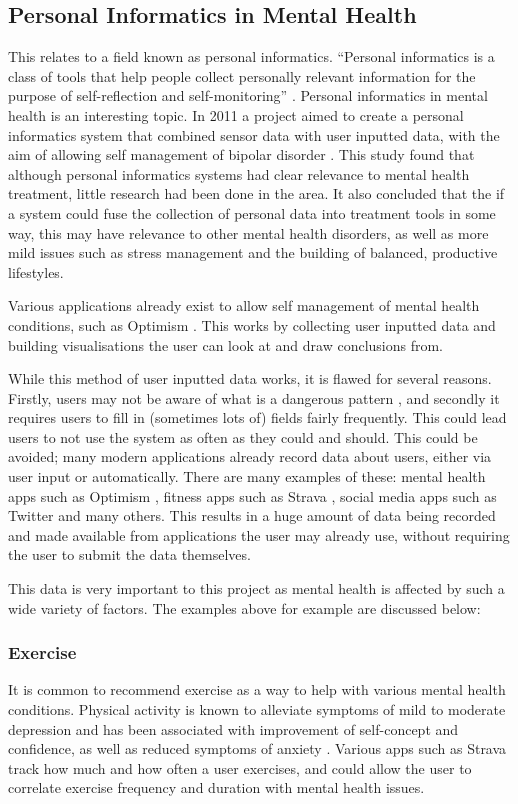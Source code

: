 \documentclass[11pt,openright,a4paper]{report}
\begin{document}
\subsection{Personal Informatics in Mental Health}
This relates to a field known as personal informatics. \enquote{Personal informatics is a class of tools that help people collect personally relevant information for the purpose of self-reflection and self-monitoring} \parencite{personalinformatics}. Personal informatics in mental health is an interesting topic. In 2011 a project aimed to create a personal informatics system that combined sensor data with user inputted data, with the aim of allowing self management of bipolar disorder \parencite{pimentalhealth}. This study found that although personal informatics systems had clear relevance to mental health treatment, little research had been done in the area. It also concluded that the if a system could fuse the collection of personal data into treatment tools in some way, this may have relevance to other mental health disorders, as well as more mild issues such as stress management and the building of balanced, productive lifestyles.

Various applications already exist to allow self management of mental health conditions, such as Optimism \parencite{optimism}. This works by collecting user inputted data and building visualisations the user can look at and draw conclusions from.

While this method of user inputted data works, it is flawed for several reasons. Firstly, users may not be aware of what is a dangerous pattern \parencite{pimentalhealth}, and secondly it requires users to fill in (sometimes lots of) fields fairly frequently. This could lead users to not use the system as often as they could and should. This could be avoided; many modern applications already record data about users, either via user input or automatically. There are many examples of these: mental health apps such as Optimism \parencite{optimism}, fitness apps such as Strava \parencite{strava}, social media apps such as Twitter \parencite{twitter} and many others. This results in a huge amount of data being recorded and made available from applications the user may already use, without requiring the user to submit the data themselves.

This data is very important to this project as mental health is affected by such a wide variety of factors. The examples above for example are discussed below:

\subsubsection{Exercise}
It is common to recommend exercise as a way to help with various mental health conditions. Physical activity is known to alleviate symptoms of mild to moderate depression and has been associated with improvement of self-concept and confidence, as well as reduced symptoms of anxiety \parencite{exercisementalhealth}. Various apps such as Strava \parencite{strava} track how much and how often a user exercises, and could allow the user to correlate exercise frequency and duration with mental health issues.
\end{document}
